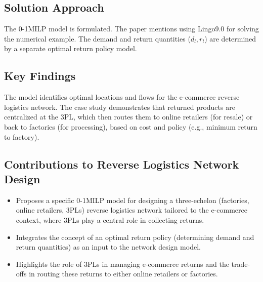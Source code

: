 \subsection*{Solution Approach}
The 0-1MILP model is formulated. The paper mentions using Lingo9.0 for solving the numerical example. The demand and return quantities ($d_l, r_l$) are determined by a separate optimal return policy model.

\subsection*{Key Findings}
The model identifies optimal locations and flows for the e-commerce reverse logistics network. The case study demonstrates that returned products are centralized at the 3PL, which then routes them to online retailers (for resale) or back to factories (for processing), based on cost and policy (e.g., minimum return to factory).

\subsection*{Contributions to Reverse Logistics Network Design}
\begin{itemize}
    \item Proposes a specific 0-1MILP model for designing a three-echelon (factories, online retailers, 3PLs) reverse logistics network tailored to the e-commerce context, where 3PLs play a central role in collecting returns.
    \item Integrates the concept of an optimal return policy (determining demand and return quantities) as an input to the network design model.
    \item Highlights the role of 3PLs in managing e-commerce returns and the trade-offs in routing these returns to either online retailers or factories.
\end{itemize}